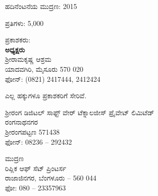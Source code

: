 \thispagestyle{empty}

\begin{flushleft}
ಹದಿನೆಂಟನೆಯ ಮುದ್ರಣ: 2015
\end{flushleft}

\vfill

\begin{flushleft}
ಪ್ರತಿಗಳು: 5,000 
\end{flushleft}

\vfill

\begin{flushleft}
ಪ್ರಕಾಶಕರು:\\\textbf{ಅಧ್ಯಕ್ಷರು}\\ಶ‍್ರೀರಾಮಕೃಷ್ಣ ಆಶ್ರಮ\\ಯಾದವಗಿರಿ, ಮೈಸೂರು 570 020\\ಫೋನ್​: (0821) 2417444, 2412424
\end{flushleft}

\vfill

\begin{flushleft}
 ಎಲ್ಲ ಹಕ್ಕುಗಳೂ ಪ್ರಕಾಶಕರಿಗೆ ಸೇರಿವೆ. 
\end{flushleft}

\vfill

\begin{flushleft}
ಶ‍್ರೀರಂಗ ಡಿಜಿಟಲ್ ಸಾಫ್ಟ್ ‍ವೇರ್ ಟೆಕ್ನಾಲಜೀಸ್ ಪ್ರೈವೇಟ್ ಲಿಮಿಟೆಡ್\\ರಂಗನಾಥನಗರ\\ಶ‍್ರೀರಂಗಪಟ್ಟಣ 571438\\ಫೋನ್​: 08236 – 292432
\end{flushleft}

\vfill

\begin{flushleft}
ಮುದ್ರಣ\\ರಿಪ್ಲಿಕ ಆಫ್ ಸೆಟ್ ಪ್ರಿಂಟರ್ಸ\\ರಾಜಾಜಿನಗರ, ಬೆಂಗಳೂರು – 560 044\\ಫೋ: 080 – 23357963
\end{flushleft}

